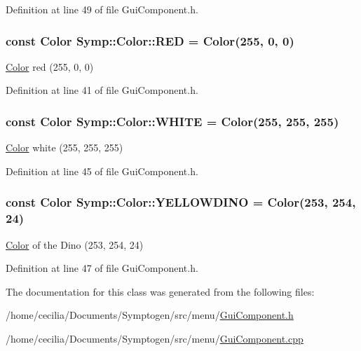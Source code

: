 Definition at line 49 of file Gui\-Component.\-h.

\hypertarget{struct_symp_1_1_color_ade2892a390cd549444d84da71164e67d}{
\subsubsection[{R\-E\-D}]{\setlength{\rightskip}{0pt plus 5cm}const {\bf Color} Symp\-::\-Color\-::\-R\-E\-D = {\bf Color}(255, 0, 0)\hspace{0.3cm}{\ttfamily [static]}}}\label{struct_symp_1_1_color_ade2892a390cd549444d84da71164e67d}
\hyperlink{struct_symp_1_1_color}{Color} red (255, 0, 0) 

Definition at line 41 of file Gui\-Component.\-h.

\hypertarget{struct_symp_1_1_color_a501e4889d9f64917b89b762de9f2e200}{
\subsubsection[{W\-H\-I\-T\-E}]{\setlength{\rightskip}{0pt plus 5cm}const {\bf Color} Symp\-::\-Color\-::\-W\-H\-I\-T\-E = {\bf Color}(255, 255, 255)\hspace{0.3cm}{\ttfamily [static]}}}\label{struct_symp_1_1_color_a501e4889d9f64917b89b762de9f2e200}
\hyperlink{struct_symp_1_1_color}{Color} white (255, 255, 255) 

Definition at line 45 of file Gui\-Component.\-h.

\hypertarget{struct_symp_1_1_color_a53e70f54d10aa2f707e2f0f97b33fde7}{
\subsubsection[{Y\-E\-L\-L\-O\-W\-D\-I\-N\-O}]{\setlength{\rightskip}{0pt plus 5cm}const {\bf Color} Symp\-::\-Color\-::\-Y\-E\-L\-L\-O\-W\-D\-I\-N\-O = {\bf Color}(253, 254, 24)\hspace{0.3cm}{\ttfamily [static]}}}\label{struct_symp_1_1_color_a53e70f54d10aa2f707e2f0f97b33fde7}
\hyperlink{struct_symp_1_1_color}{Color} of the Dino (253, 254, 24) 

Definition at line 47 of file Gui\-Component.\-h.



The documentation for this class was generated from the following files\-:\begin{DoxyCompactItemize}
\item 
/home/cecilia/\-Documents/\-Symptogen/src/menu/\hyperlink{_gui_component_8h}{Gui\-Component.\-h}\item 
/home/cecilia/\-Documents/\-Symptogen/src/menu/\hyperlink{_gui_component_8cpp}{Gui\-Component.\-cpp}\end{DoxyCompactItemize}
